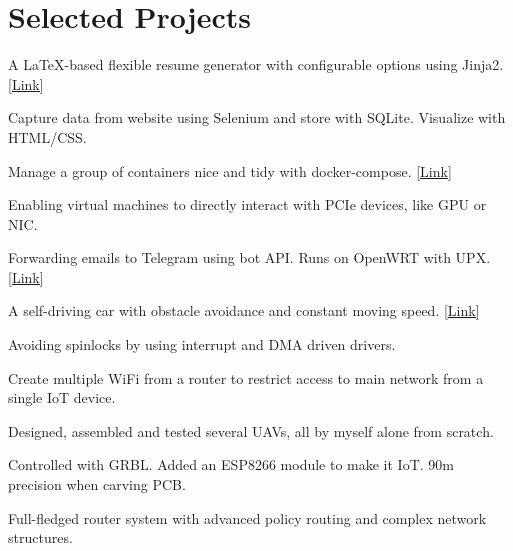 \documentclass[letterpaper,11pt]{article}
\newcommand{\resumeSubHeadingListStart}{\begin{itemize}[leftmargin=0pt,label={}]}
\newcommand{\resumeSubHeadingListEnd}{\end{itemize}}
\begin{document}
\section{Selected Projects}{
    \resumeSubHeadingListStart
        {A \LaTeX-based flexible resume generator with configurable options using Jinja2. [\href{https://github.com/ly4096x/Flexible\_Resume}{\underline{Link}}]}{}

        {Capture data from website using Selenium and store with SQLite. Visualize with HTML/CSS.}{}

        {Manage a group of containers nice and tidy with docker-compose. [\href{https://github.com/ly4096x/ECE6383\_HSN\_Lab4\_Network}{\underline{Link}}]}{}

        {Enabling virtual machines to directly interact with PCIe devices, like GPU or NIC.}{}

        {Forwarding emails to Telegram using bot API. Runs on OpenWRT with UPX. [\href{https://github.com/ly4096x/smtp\_to\_telegram}{\underline{Link}}]}{}

        {A self-driving car with obstacle avoidance and constant moving speed. [\href{https://github.com/ly4096x/RTES\_STM32F4}{\underline{Link}}]}{}

        {Avoiding spinlocks by using interrupt and DMA driven drivers.}{}

        {Create multiple WiFi from a router to restrict access to main network from a single IoT device.}{}

        {Designed, assembled and tested several UAVs, all by myself alone from scratch.}{}

        {Controlled with GRBL. Added an ESP8266 module to make it IoT. 90{\textmu}m precision when carving PCB.}{}

        {Full-fledged router system with advanced policy routing and complex network structures.}{}
    \resumeSubHeadingListEnd
}

\end{document}
